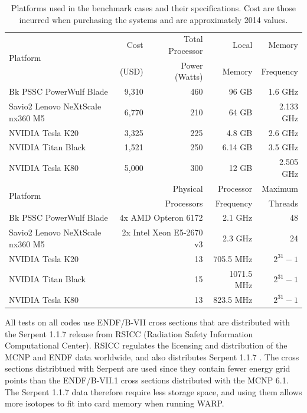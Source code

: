\documentclass[preprint,12pt]{elsarticle}
\begin{document}
\begin{table}[h]
\centering
\caption{Platforms used in the benchmark cases and their specifications.  Cost are those incurred when purchasing the systems and are approximately 2014 values.}
\label{platform_table}
\small
\begin{tabular}{| l | r | r | r | r |}
\hline
\multirow{2}{*}{Platform} &              Cost   & Total Processor  & Local       & Memory     \\
                                       & (USD)  & Power (Watts)   & Memory  & Frequency \\
\hline
Bk PSSC PowerWulf Blade       &    9,310   & 460 &  96 GB        &  1.6 GHz                    \\
\hline
Savio2 Lenovo NeXtScale nx360 M5       &   6,770    &  210  &  64 GB        & 2.133  GHz                    \\
\hline
NVIDIA Tesla K20         &    3,325     & 225 &  4.8  GB      &  2.6 GHz                  \\
\hline
NVIDIA Titan Black       &    1,521   & 250 &  6.14 GB        & 3.5 GHz              \\
\hline
NVIDIA Tesla K80       &    5,000    & 300 &  12 GB        &  2.505 GHz              \\
\hline
\hline
\hline
\multirow{2}{*}{Platform}  &  \multicolumn{2}{r|}{Physical }     & Processor  & Maximum \\
                                        & \multicolumn{2}{r|}{Processors}  & Frequency  & Threads \\
\hline
Bk PSSC PowerWulf Blade       &   \multicolumn{2}{r|}{4x AMD Opteron 6172 }  &  2.1 GHz     &  48           \\
\hline
Savio2 Lenovo NeXtScale nx360 M5   &   \multicolumn{2}{r|}{2x Intel Xeon E5-2670 v3}  &  2.3 GHz     &  24           \\
\hline
NVIDIA Tesla K20         &       \multicolumn{2}{r|}{13}   &  705.5 MHz     &  $2^{31}-1$           \\
\hline
NVIDIA Titan Black       &      \multicolumn{2}{r|}{ 15 }  &  1071.5 MHz     & $2^{31}-1$           \\
\hline
NVIDIA Tesla K80      &      \multicolumn{2}{r|}{ 13 }  &  823.5 MHz     & $2^{31}-1$           \\
\hline

\end{tabular}
\end{table}

All tests on all codes use ENDF/B-VII cross sections that are distributed with the Serpent 1.1.7 release from RSICC (Radiation Safety Information Computational Center).  RSICC regulates the licensing and distribution of the MCNP and ENDF data worldwide, and also distributes Serpent 1.1.7 \cite{serpdata}.  The cross sections distribtued with Serpent are used since they contain fewer energy grid points than the ENDF/B-VII.1 cross sections distributed with the MCNP 6.1.  The Serpent 1.1.7 data therefore require less storage space, and using them allows more isotopes to fit into card memory when running WARP.
\end{document}

